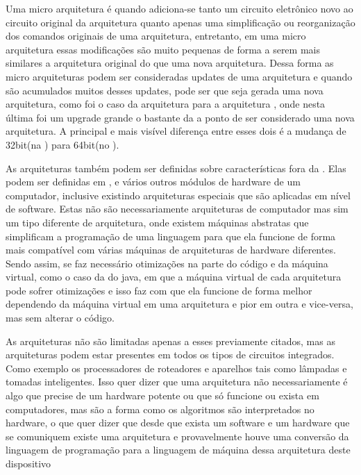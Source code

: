 \documentclass[
	12pt,				%
	openright,			%
	oneside,			%
	a4paper,			%
	english,			%
	french,				%
	spanish,			%
	brazil,				%
	]{abntex2}
\begin{document}
Uma micro arquitetura é quando adiciona-se tanto um circuito eletrônico novo ao circuito original da arquitetura quanto apenas uma simplificação ou reorganização dos comandos originais de uma arquitetura, entretanto, em uma micro arquitetura essas modificações são muito pequenas de forma a serem mais similares a arquitetura original do que uma nova arquitetura. Dessa forma as micro arquiteturas podem ser consideradas updates de uma arquitetura e quando são acumulados muitos desses updates, pode ser que seja gerada uma nova arquitetura, como foi o caso da arquitetura  para a arquitetura , onde nesta última foi um upgrade grande o bastante da  a ponto de ser considerado uma nova arquitetura. A principal e mais visível diferença entre esses dois é a mudança de 32bit(na ) para 64bit(no ).\newline

As arquiteturas também podem ser definidas sobre características fora da . Elas podem ser definidas em , e vários outros módulos de hardware de um computador, inclusive existindo arquiteturas especiais que são aplicadas em nível de software. Estas não são necessariamente arquiteturas de computador mas sim um tipo diferente de arquitetura, onde existem máquinas abstratas que simplificam a programação de uma linguagem para que ela funcione de forma mais compatível com várias máquinas de arquiteturas de hardware diferentes. Sendo assim, se faz necessário otimizações na parte do código e da máquina virtual, como o caso da  do java, em que a máquina virtual de cada arquitetura pode sofrer otimizações e isso faz com que ela funcione de forma melhor dependendo da máquina virtual em uma arquitetura e pior em outra e vice-versa, mas sem alterar o código.\newline

As arquiteturas não são limitadas apenas a esses previamente citados, mas as arquiteturas podem estar presentes em todos os tipos de circuitos integrados. Como exemplo os processadores de roteadores e aparelhos  tais como lâmpadas e tomadas inteligentes. Isso quer dizer que uma arquitetura não necessariamente é algo que precise de um hardware potente ou que só funcione ou exista em computadores, mas são a forma como os algoritmos são interpretados no hardware, o que quer dizer que desde que exista um software e um hardware que se comuniquem existe uma arquitetura e provavelmente houve uma conversão da linguagem de programação para a linguagem de máquina dessa arquitetura deste dispositivo\newline
\end{document}

